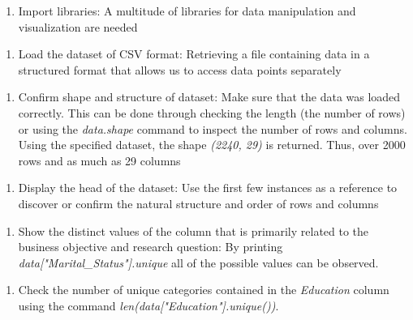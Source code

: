 \documentclass[11pt]{article}
\begin{document}
\vspace{1\baselineskip}
\begin{enumerate}
	\item Import libraries: A multitude of libraries for data manipulation and visualization are needed

\end{enumerate}
\vspace{1\baselineskip}
\begin{enumerate}
	\item Load the dataset of CSV format: Retrieving a file containing data in a structured format that allows us to access data points separately

\end{enumerate}
\vspace{1\baselineskip}
\begin{enumerate}
	\item Confirm shape and structure of dataset: Make sure that the data was loaded correctly. This can be done through checking the length (the number of rows) or using the \textit{data.shape} command to inspect the number of rows and columns. Using the specified dataset, the shape \textit{(2240, 29)} is returned. Thus, over 2000 rows and as much as 29 columns

\end{enumerate}
\vspace{1\baselineskip}
\begin{enumerate}
	\item Display the head of the dataset: Use the first few instances as a reference to discover or confirm the natural structure and order of rows and columns

\end{enumerate}
\vspace{1\baselineskip}
\begin{enumerate}
	\item Show the distinct values of the column that is primarily related to the business objective and research question: By printing \textit{data["Marital\_Status"].unique} all of the possible values can be observed.

\end{enumerate}
\vspace{1\baselineskip}
\begin{enumerate}
	\item Check the number of unique categories contained in the \textit{Education} column using the command \textit{len(data["Education"].unique())}.

\end{enumerate}
\end{document}
